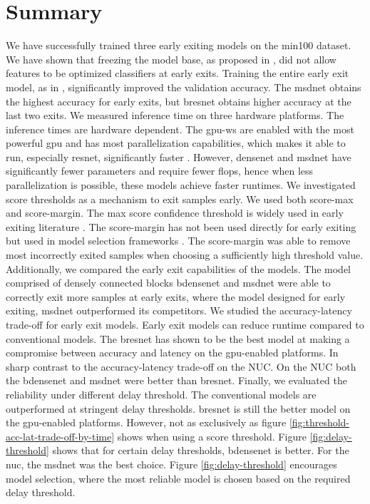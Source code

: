 \section{Summary} \label{sec:ee-summary}
We have successfully trained three early exiting models on the \gls{min100} dataset. We have shown that freezing the model base, as proposed in \cite{leroux_resource-constrained_2015}, did not allow features to be optimized classifiers at early exits. Training the entire early exit model, as in \cite{teerapittayanon_branchynet:_2016}, significantly improved the validation accuracy. The \gls{msdnet} obtains the highest accuracy for early exits, but \gls{bresnet} obtains higher accuracy at the last two exits. 
We measured inference time on three hardware platforms. The inference times are hardware dependent. The \gls{gpu-ws} are enabled with the most powerful \gls{gpu} and has most parallelization capabilities, which makes it able to run, especially \gls{resnet}, significantly faster \cite{lee_energy_2019}. However, \gls{densenet} and \gls{msdnet} have significantly fewer parameters and require fewer \gls{flop}s, hence when less parallelization is possible, these models achieve faster runtimes.
We investigated score thresholds as a mechanism to exit samples early. We used both score-max and score-margin. The max score confidence threshold is widely used in early exiting literature \cite{leroux_resource-constrained_2015, leroux_cascading_2017, kaya_shallow-deep_nodate, berestizshevsky_sacrificing_2019}. The score-margin has not been used directly for early exiting but used in model selection frameworks \cite{park_big/little_2015,tann_flexible_2018}. The score-margin was able to remove most incorrectly exited samples when choosing a sufficiently high threshold value. Additionally, we compared the early exit capabilities of the models. The model comprised of densely connected blocks \gls{bdensenet} and \gls{msdnet} were able to correctly exit more samples at early exits, where the model designed for early exiting, \gls{msdnet} outperformed its competitors. 
We studied the accuracy-latency trade-off for early exit models. Early exit models can reduce runtime compared to conventional models. The \gls{bresnet} has shown to be the best model at making a compromise between accuracy and latency on the \gls{gpu}-enabled platforms. In sharp contrast to the accuracy-latency trade-off on the NUC. On the NUC both the \gls{bdensenet} and \gls{msdnet} were better than \gls{bresnet}.
Finally, we evaluated the reliability under different delay threshold. The conventional models are outperformed at stringent delay thresholds. \gls{bresnet} is still the better model on the \gls{gpu}-enabled platforms. However, not as exclusively as figure \ref{fig:threshold-acc-lat-trade-off-by-time} shows when using a score threshold. Figure \ref{fig:delay-threshold} shows that for certain delay thresholds, \gls{bdensenet} is better. For the \gls{nuc}, the \gls{msdnet} was the best choice.
Figure \ref{fig:delay-threshold} encourages model selection, where the most reliable model is chosen based on the required delay threshold.
